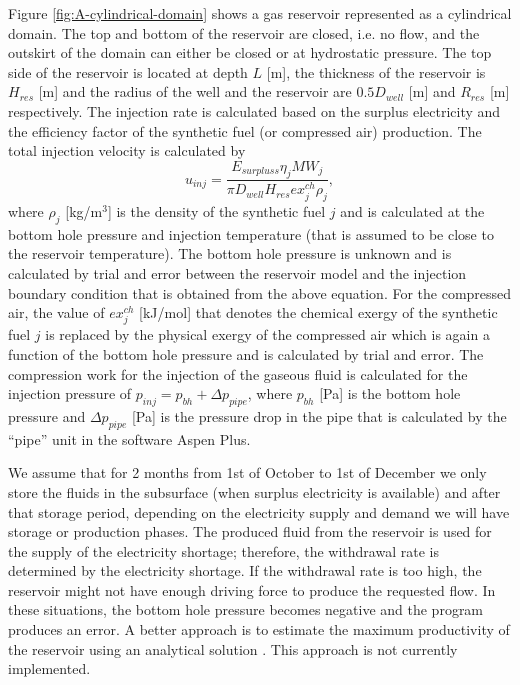 \documentclass{ECOS_2021}
\begin{document}
Figure \ref{fig:A-cylindrical-domain} shows a gas reservoir represented
as a cylindrical domain. The top and bottom of the reservoir are closed,
i.e. no flow, and the outskirt of the domain can either be closed
or at hydrostatic pressure. The top side of the reservoir is located
at depth $L$ {[}m{]}, the thickness of the reservoir is $H_{res}$
{[}m{]} and the radius of the well and the reservoir are $0.5D_{well}$
{[}m{]} and $R_{res}$ {[}m{]} respectively. The injection rate is
calculated based on the surplus electricity and the efficiency factor
of the synthetic fuel (or compressed air) production. The total injection
velocity is calculated by
\[
u_{inj}=\frac{E_{surpluss}\eta_{j}MW_{j}}{\pi D_{well}H_{res}ex_{j}^{ch}\rho_{j}},
\]
where $\rho_{j}$ {[}kg/m$^{3}${]} is the density of the synthetic
fuel $j$ and is calculated at the bottom hole pressure and injection
temperature (that is assumed to be close to the reservoir temperature).
The bottom hole pressure is unknown and is calculated by trial and
error between the reservoir model and the injection boundary condition
that is obtained from the above equation. For the compressed air,
the value of $ex_{j}^{ch}$ {[}kJ/mol{]} that denotes the chemical
exergy of the synthetic fuel $j$ is replaced by the physical exergy
of the compressed air which is again a function of the bottom hole
pressure and is calculated by trial and error. The compression work
for the injection of the gaseous fluid is calculated for the injection
pressure of $p_{inj}=p_{bh}+\Delta p_{pipe}$, where $p_{bh}$ {[}Pa{]}
is the bottom hole pressure and $\Delta p_{pipe}$ {[}Pa{]} is the
pressure drop in the pipe that is calculated by the ``pipe'' unit
in the software Aspen Plus.

We assume that for 2 months from 1st of October to 1st of December
we only store the fluids in the subsurface (when surplus electricity
is available) and after that storage period, depending on the electricity
supply and demand we will have storage or production phases. The produced
fluid from the reservoir is used for the supply of the electricity
shortage; therefore, the withdrawal rate is determined by the electricity
shortage. If the withdrawal rate is too high, the reservoir might
not have enough driving force to produce the requested flow. In these
situations, the bottom hole pressure becomes negative and the program
produces an error. A better approach is to estimate the maximum productivity
of the reservoir using an analytical solution \cite{hagoortFundamentalsGasReservoir1988,al-hussainyApplicationRealGas1966,al-hussainyFlowRealGases1966}.
This approach is not currently implemented. 
\end{document}
